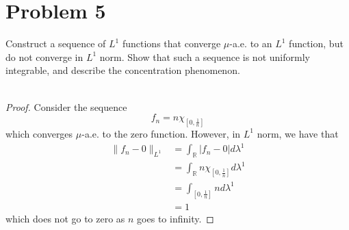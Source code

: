 \documentclass[fontsize=11pt]{scrartcl} %
\numberwithin{equation}{section} %
\numberwithin{figure}{section} %
\numberwithin{table}{section} %
\newcommand{\R}{\mathbb{R}}
\begin{document}
\section*{Problem 5}
Construct a sequence of $L^1$ functions that converge $\mu$-a.e. to an $L^1$
function, but do not converge in $L^1$ norm. Show that such a sequence is not
uniformly integrable, and describe the concentration phenomenon.
\\
\\
\begin{proof}
    Consider the sequence
    \[
        f_n = n\chi_{[0,\frac{1}{n}]}
    \]
    which converges $\mu$-a.e. to the zero function. However, in $L^1$ norm, we
    have that
    \[
        \begin{aligned}
            \|f_n-0\|_{L^1} &= \int_{\R}|f_n-0|d\lambda^1\\
                            &= \int_{\R}n\chi_{[0,\frac{1}{n}]}d\lambda^1\\
                            &= \int_{[0,\frac{1}{n}]}nd\lambda^1\\
                            &=1
        \end{aligned}
    \]
    which does not go to zero as $n$ goes to infinity.

\end{proof}
\end{document}
